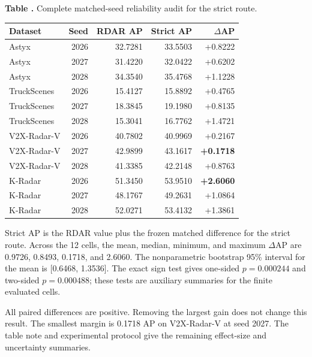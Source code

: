 \documentclass[sensors,article,submit,pdftex,moreauthors]{Definitions/mdpi}
\begin{document}
\begin{samepage}
\noindent
\begin{minipage}{\textwidth}
\label{tab:paired-results}
\noindent\textbf{Table \thetable.} Complete matched-seed reliability audit for
the strict route.\par
\vspace{2pt}
\begingroup
\scriptsize
\setlength{\tabcolsep}{4pt}
\renewcommand{\arraystretch}{1.14}
\begin{tabularx}{\textwidth}{@{}Xrrrr@{}}
\toprule
Dataset & Seed & RDAR AP & Strict AP & $\Delta$AP \\
\midrule
Astyx & 2026 & 32.7281 & 33.5503 & +0.8222 \\
Astyx & 2027 & 31.4220 & 32.0422 & +0.6202 \\
Astyx & 2028 & 34.3540 & 35.4768 & +1.1228 \\
\addlinespace
TruckScenes & 2026 & 15.4127 & 15.8892 & +0.4765 \\
TruckScenes & 2027 & 18.3845 & 19.1980 & +0.8135 \\
TruckScenes & 2028 & 15.3041 & 16.7762 & +1.4721 \\
\addlinespace
V2X-Radar-V & 2026 & 40.7802 & 40.9969 & +0.2167 \\
V2X-Radar-V & 2027 & 42.9899 & 43.1617 & \textbf{+0.1718} \\
V2X-Radar-V & 2028 & 41.3385 & 42.2148 & +0.8763 \\
\addlinespace
K-Radar & 2026 & 51.3450 & 53.9510 & \textbf{+2.6060} \\
K-Radar & 2027 & 48.1767 & 49.2631 & +1.0864 \\
K-Radar & 2028 & 52.0271 & 53.4132 & +1.3861 \\
\bottomrule
\end{tabularx}
\endgroup
\vspace{2pt}
\parbox{\textwidth}{\scriptsize
Strict AP is the RDAR value plus the frozen matched difference for the strict
route. Across the 12 cells, the mean, median, minimum, and maximum $\Delta$AP
are 0.9726, 0.8493, 0.1718, and 2.6060. The nonparametric bootstrap 95\%
interval for the mean is [0.6468, 1.3536]. The exact sign test gives one-sided
$p=0.000244$ and two-sided $p=0.000488$; these tests are auxiliary summaries
for the finite evaluated cells.}
\end{minipage}
\end{samepage}

All paired differences are positive. Removing the largest gain does not change
this result. The smallest margin is 0.1718 AP on V2X-Radar-V at seed 2027.
The table note and experimental protocol give the remaining effect-size and
uncertainty summaries.
\end{document}
